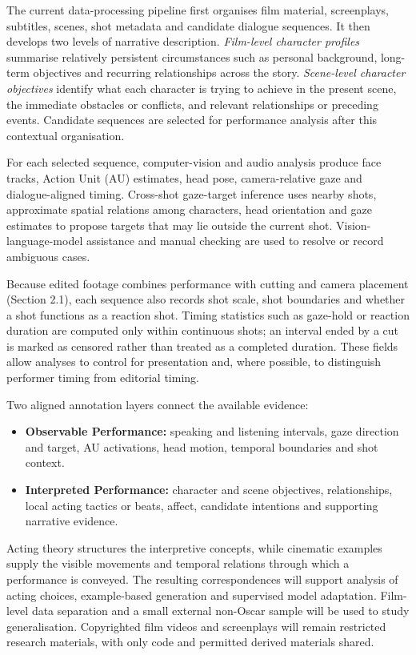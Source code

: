 \documentclass[11pt,a4paper]{article}
\begin{document}
The current data-processing pipeline first organises film material, screenplays, subtitles, scenes, shot metadata and candidate dialogue sequences. It then develops two levels of narrative description. \emph{Film-level character profiles} summarise relatively persistent circumstances such as personal background, long-term objectives and recurring relationships across the story. \emph{Scene-level character objectives} identify what each character is trying to achieve in the present scene, the immediate obstacles or conflicts, and relevant relationships or preceding events. Candidate sequences are selected for performance analysis after this contextual organisation.

For each selected sequence, computer-vision and audio analysis produce face tracks, Action Unit (AU) estimates, head pose, camera-relative gaze and dialogue-aligned timing. Cross-shot gaze-target inference uses nearby shots, approximate spatial relations among characters, head orientation and gaze estimates to propose targets that may lie outside the current shot. Vision-language-model assistance and manual checking are used to resolve or record ambiguous cases.

Because edited footage combines performance with cutting and camera placement (Section 2.1), each sequence also records shot scale, shot boundaries and whether a shot functions as a reaction shot. Timing statistics such as gaze-hold or reaction duration are computed only within continuous shots; an interval ended by a cut is marked as censored rather than treated as a completed duration. These fields allow analyses to control for presentation and, where possible, to distinguish performer timing from editorial timing.

Two aligned annotation layers connect the available evidence:
\begin{itemize}
\item \textbf{Observable Performance:} speaking and listening intervals, gaze direction and target, AU activations, head motion, temporal boundaries and shot context.
\item \textbf{Interpreted Performance:} character and scene objectives, relationships, local acting tactics or beats, affect, candidate intentions and supporting narrative evidence.
\end{itemize}
Acting theory structures the interpretive concepts, while cinematic examples supply the visible movements and temporal relations through which a performance is conveyed. The resulting correspondences will support analysis of acting choices, example-based generation and supervised model adaptation. Film-level data separation and a small external non-Oscar sample will be used to study generalisation. Copyrighted film videos and screenplays will remain restricted research materials, with only code and permitted derived materials shared.
\end{document}

